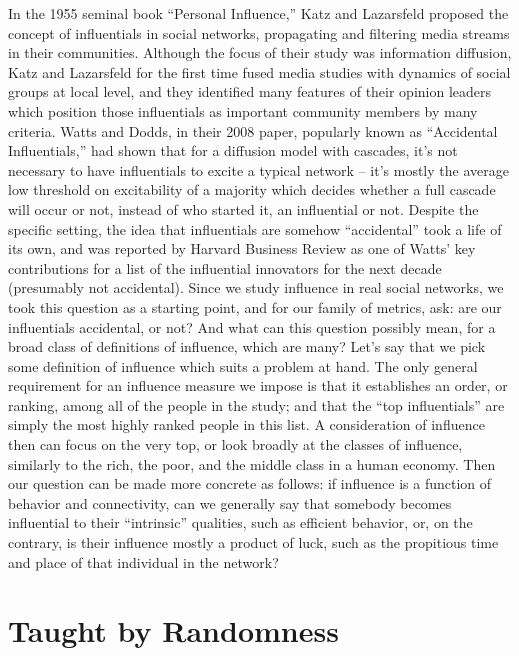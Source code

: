 \documentclass[10pt,oneside]{memoir}
\begin{document}
In the 1955 seminal book ``Personal Influence,'' Katz and Lazarsfeld proposed the concept of influentials in social networks, propagating and filtering media streams in their communities.  Although the focus of their study was information diffusion, Katz and Lazarsfeld for the first time fused media studies with dynamics of social groups at local level, and they identified many features of their opinion leaders which position those influentials as important community members by many criteria.
Watts and Dodds, in their 2008 paper, popularly known as ``Accidental Influentials,'' had shown that for a diffusion model with cascades, it's not necessary to have influentials to excite a typical network -- it's mostly the average low threshold on excitability of a majority which decides whether a full cascade will occur or not, instead of who started it, an influential or not.  Despite the specific setting, the idea that influentials are somehow ``accidental'' took a life of its own, and was reported by Harvard Business Review as one of Watts' key contributions for a list of the influential innovators for the next decade (presumably not accidental).
Since we study influence in real social networks, we took this question as a starting point, and for our family of metrics, ask: are our influentials accidental, or not?  And what can this question possibly mean, for a broad class of definitions of influence, which are many?
Let's say that we pick some definition of influence which suits a problem at hand.  The only general requirement for an influence measure we impose is that it establishes an order, or ranking, among all of the people in the study; and that the ``top influentials'' are simply the most highly ranked people in this list.  A consideration of influence then can focus on the very top, or look broadly at the classes of influence, similarly to the rich, the poor, and the middle class in a human economy.
Then our question can be made more concrete as follows: if influence is a function of behavior and connectivity, can we generally say that somebody becomes influential to their ``intrinsic'' qualities, such as efficient behavior, or, on the contrary, is their influence mostly a product of luck, such as the propitious time and place of that individual in the network?


\section{Taught by Randomness}
\label{taughtbyrandomness}
\end{document}
